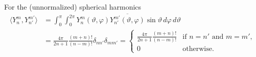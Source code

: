 \begin{theorem} For the (unnormalized) spherical harmonics
  \label{kugel:thm:spherical-harmonics-ortho}
  \begin{align}
    \langle Y^m_n, Y^{m'}_{n'} \rangle
    &= \int_{0}^\pi \int_0^{2\pi}
      Y^m_n(\vartheta, \varphi) \overline{Y^{m'}_{n'}(\vartheta, \varphi)}
      \sin \vartheta \, d\varphi \, d\vartheta
      \label{kugel:eq:spherical-harmonics-inner-prod} \\
    &= \frac{4\pi}{2n + 1} \frac{(m + n)!}{(n - m)!} \delta_{nn'} \delta_{mm'}
    = \begin{cases}
      \frac{4\pi}{2n + 1} \frac{(m + n)!}{(n - m)!}
        & \text{if } n = n' \text{ and } m = m', \nonumber \\
      0 & \text{otherwise}.
    \end{cases}
  \end{align}
\end{theorem}
